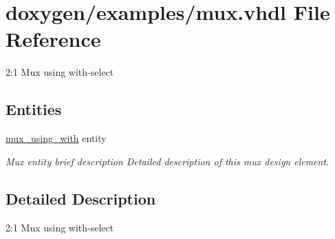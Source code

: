 \hypertarget{mux_8vhdl}{}\section{doxygen/examples/mux.vhdl File Reference}
\label{mux_8vhdl}


2\+:1 Mux using with-\/select  


\subsection*{Entities}
\begin{DoxyCompactItemize}
\item 
\mbox{\hyperlink{classmux__using__with}{mux\+\_\+using\+\_\+with}} entity
\begin{DoxyCompactList}\small\item\em Mux entity brief description Detailed description of this mux design element. \end{DoxyCompactList}\end{DoxyCompactItemize}


\subsection{Detailed Description}
2\+:1 Mux using with-\/select 

